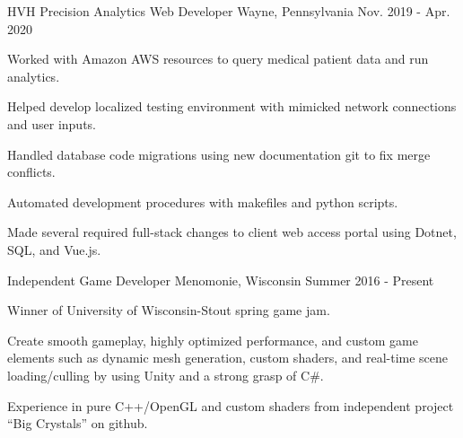 

\begin{cventries}

  \cventry
    {HVH Precision Analytics} %
    {Web Developer} %
    {Wayne, Pennsylvania} %
    {Nov. 2019 - Apr. 2020} %
    {
      \begin{cvitems} %
        \item {Worked with Amazon AWS resources to query medical patient data and run analytics.}
        \item {Helped develop localized testing environment with mimicked network connections and user inputs.}
        \item {Handled database code migrations using new documentation git to fix merge conflicts.}
        \item {Automated development procedures with makefiles and python scripts.}
        \item {Made several required full-stack changes to client web access portal using Dotnet, SQL, and Vue.js.}
      \end{cvitems}
    }

  \cventry
    {Independent} %
    {Game Developer} %
    {Menomonie, Wisconsin} %
    {Summer 2016 - Present} %
    {
      \begin{cvitems} %
        \item {Winner of University of Wisconsin-Stout spring game jam.}
        \item {Create smooth gameplay, highly optimized performance, and custom game elements such as dynamic mesh generation, custom shaders, and real-time scene loading/culling by using Unity and a strong grasp of C\#.}
        \item {Experience in pure C++/OpenGL and custom shaders from independent project ``Big Crystals'' on github.}
      \end{cvitems}
    }


\end{cventries}
